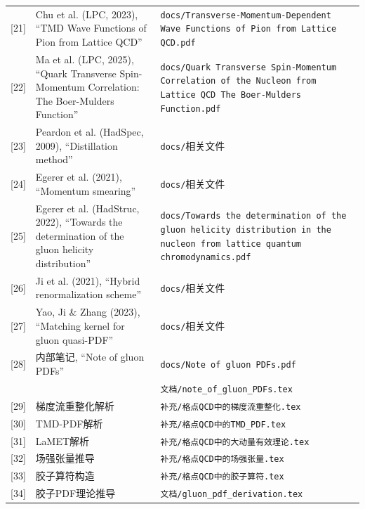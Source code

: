 \documentclass[12pt,a4paper]{ctexart}
\theoremstyle{definition}
\begin{document}
\begin{longtable}{lp{6cm}p{5cm}}
[21] & Chu et al. (LPC, 2023), ``TMD Wave Functions of Pion from Lattice QCD'' & \texttt{docs/Transverse-Momentum-Dependent Wave Functions of Pion from Lattice QCD.pdf} \\

[22] & Ma et al. (LPC, 2025), ``Quark Transverse Spin-Momentum Correlation: The Boer-Mulders Function'' & \texttt{docs/Quark Transverse Spin-Momentum Correlation of the Nucleon from Lattice QCD The Boer-Mulders Function.pdf} \\

[23] & Peardon et al. (HadSpec, 2009), ``Distillation method'' & \texttt{docs/}相关文件 \\

[24] & Egerer et al. (2021), ``Momentum smearing'' & \texttt{docs/}相关文件 \\

[25] & Egerer et al. (HadStruc, 2022), ``Towards the determination of the gluon helicity distribution'' & \texttt{docs/Towards the determination of the gluon helicity distribution in the nucleon from lattice quantum chromodynamics.pdf} \\

[26] & Ji et al. (2021), ``Hybrid renormalization scheme'' & \texttt{docs/}相关文件 \\

[27] & Yao, Ji \& Zhang (2023), ``Matching kernel for gluon quasi-PDF'' & \texttt{docs/}相关文件 \\

[28] & 内部笔记, ``Note of gluon PDFs'' & \texttt{docs/Note of gluon PDFs.pdf} \\
    & & \texttt{文档/note\_of\_gluon\_PDFs.tex} \\

[29] & 梯度流重整化解析 & \texttt{补充/格点QCD中的梯度流重整化.tex} \\

[30] & TMD-PDF解析 & \texttt{补充/格点QCD中的TMD\_PDF.tex} \\

[31] & LaMET解析 & \texttt{补充/格点QCD中的大动量有效理论.tex} \\

[32] & 场强张量推导 & \texttt{补充/格点QCD中的场强张量.tex} \\

[33] & 胶子算符构造 & \texttt{补充/格点QCD中的胶子算符.tex} \\

[34] & 胶子PDF理论推导 & \texttt{文档/gluon\_pdf\_derivation.tex} \\


\end{longtable}
\end{document}
